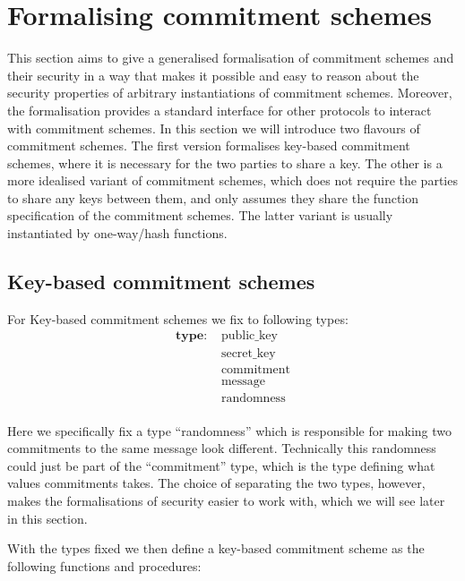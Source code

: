 \chapter{Formalising commitment schemes}
\label{ch:formal_commitment}
This section aims to give a generalised formalisation of commitment schemes and
their security in a way that makes it possible and easy to reason about the
security properties of arbitrary instantiations of commitment schemes. Moreover,
the formalisation provides a standard interface for other protocols to interact
with commitment schemes.
In this section we will introduce two flavours of commitment schemes. The first
version formalises key-based commitment schemes, where it is necessary for the
two parties to share a key. The other is a more idealised variant of commitment
schemes, which does not require the parties to share any keys between them, and
only assumes they share the function specification of the commitment schemes.
The latter variant is usually instantiated by one-way/hash functions.

\section{Key-based commitment schemes}
\label{sec:commitment:key-based}
For Key-based commitment schemes we fix to following types:
\begin{align*}
  \textbf{type: } &\text{public\_key} \\
  &\text{secret\_key} \\
  &\text{commitment} \\
  &\text{message} \\
  &\text{randomness} \\
\end{align*}

Here we specifically fix a type ``randomness'' which is responsible for making two
commitments to the same message look different. Technically this randomness
could just be part of the ``commitment'' type, which is the type defining what
values commitments takes. The choice of separating the two types, however, makes
the formalisations of security easier to work with, which we will see later in
this section.

With the types fixed we then define a key-based commitment scheme as the
following functions and procedures:

